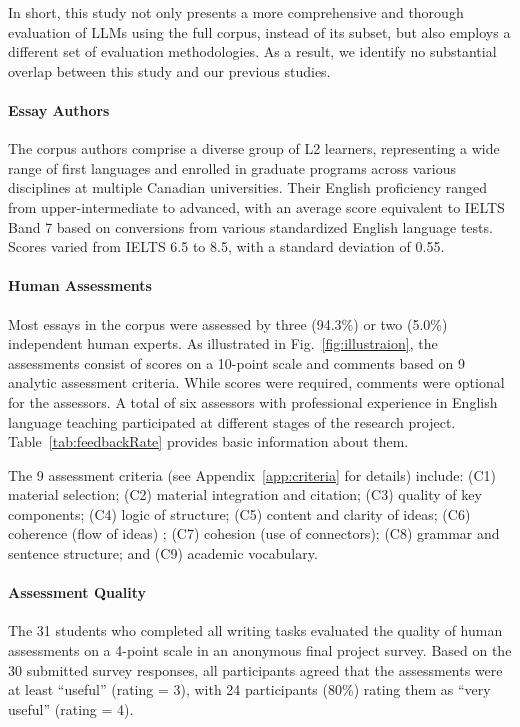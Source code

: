 In short, this study not only presents a more comprehensive and thorough evaluation of LLMs using the full corpus, instead of its subset, but also employs a different set of evaluation methodologies. As a result, we identify no substantial overlap between this study and our previous studies.



\paragraph{Essay Authors} The corpus authors comprise a diverse group of L2 learners, representing a wide range of first languages and enrolled in graduate programs across various disciplines at multiple Canadian universities. Their English proficiency ranged from upper-intermediate to advanced, with an average score equivalent to IELTS Band 7 based on conversions from various standardized English language tests. Scores varied from IELTS 6.5 to 8.5, with a standard deviation of 0.55.


\paragraph{Human Assessments} Most essays in the corpus were assessed by three (94.3\%) or two (5.0\%) independent human experts. As illustrated in Fig.~\ref{fig:illustraion}, the assessments consist of scores on a 10-point scale and comments based on 9 analytic assessment criteria. While scores were required, comments were optional for the assessors. A total of six assessors with professional experience in English language teaching participated at different stages of the research project. Table~\ref{tab:feedbackRate} provides basic information about them.

The 9 assessment criteria (see Appendix~\ref{app:criteria} for details) include: (C1) material selection; (C2) material integration and citation; (C3) quality of key components; (C4) logic of structure; (C5) content and clarity of ideas; (C6) coherence (flow of ideas) ; (C7) cohesion (use of connectors); (C8) grammar and sentence structure; and (C9) academic vocabulary. 




\paragraph{Assessment Quality}  The 31 students who completed all writing tasks evaluated the quality of human assessments on a 4-point scale in an anonymous final project survey. Based on the 30 submitted survey responses, all participants agreed that the assessments were at least ``useful'' (rating = 3), with 24 participants (80\%) rating them as ``very useful'' (rating = 4). 

